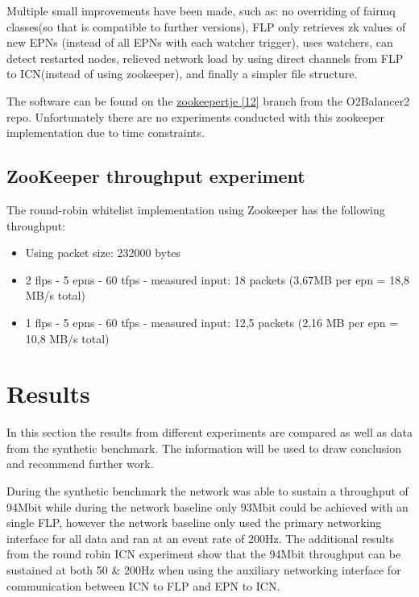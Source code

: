 \documentclass[]{article}
\begin{document}
Multiple small improvements have been made, such as: no overriding of fairmq classes(so that is compatible to further versions), FLP only retrieves zk values of new EPNs (instead of all EPNs with each watcher trigger), uses watchers, can detect restarted nodes, relieved network load by using direct channels from FLP to ICN(instead of using zookeeper), and finally a simpler file structure.

The software can be found on the \hyperref[sec:ref12]{zookeepertje [12]} branch from the O2Balancer2 repo. Unfortunately there are no experiments conducted with this zookeeper implementation due to time constraints.

\subsection{ZooKeeper throughput experiment} 
The round-robin whitelist implementation using Zookeeper has the following throughput:
\begin{itemize}
	\itemsep 0em
	\item Using packet size: 232000 bytes
	\item 2 flps - 5 epns - 60 tfps - measured input: 18 packets (3,67MB per epn = 18,8 MB/s total)
	\item 1 flps - 5 epns - 60 tfps - measured input: 12,5 packets (2,16 MB per epn = 10,8 MB/s total)
\end{itemize}

\section{Results}
In this section the results from different experiments are compared as well as data from the synthetic benchmark. The information will be used to draw conclusion and recommend further work.

During the synthetic benchmark the network was able to sustain a throughput of 94Mbit while during the network baseline only 93Mbit could be achieved with an single FLP, however the network baseline only used the primary networking interface for all data and ran at an event rate of 200Hz. The additional results from the round robin ICN experiment show that the 94Mbit throughput can be sustained at both 50 \& 200Hz when using the auxiliary networking interface for communication between ICN to FLP and EPN to ICN.
\end{document}
